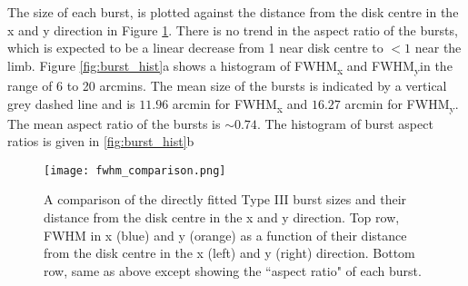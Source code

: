

The size of each burst, is plotted against the distance from the disk centre in the x and y direction in Figure \ref{fig:fwhm_comp}. 
There is no trend in the aspect ratio of the bursts, which is expected to be a linear decrease from 1 near disk centre to $< 1$ near the limb. Figure \ref{fig:burst_hist}a shows a histogram of FWHM\textsubscript{x} and FWHM\textsubscript{y}in the range of 6 to 20 arcmins. The mean size of the bursts is indicated by a vertical grey dashed line and is $11.96$ arcmin for FWHM\textsubscript{x} and $16.27$ arcmin for FWHM\textsubscript{y}. The mean aspect ratio of the bursts is $\sim 0.74$. The histogram of burst aspect ratios is given in \ref{fig:burst_hist}b

\begin{figure}[ht]
\centering
\texttt{[image: fwhm\_comparison.png]}
\caption[Directly fitted Type III burst sizes as a function of position relative to disk centre.]{A comparison of the directly fitted Type III burst sizes and their distance from the disk centre in the x and y direction. Top row, FWHM in x (blue) and y (orange) as a function of their distance from the disk centre in the x (left) and y (right) direction. Bottom row, same as above except showing the ``aspect ratio" of each burst.}
\label{fig:fwhm_comp}
\end{figure}

